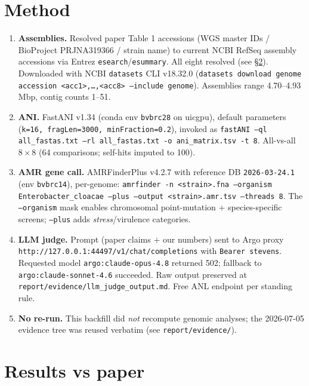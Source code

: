 \documentclass[11pt]{article}
\begin{document}
\section{Method}
\label{sec:method}
\begin{enumerate}[leftmargin=*]
\item \textbf{Assemblies.} Resolved paper Table 1 accessions (WGS master IDs / BioProject
      PRJNA319366 / strain name) to current NCBI RefSeq assembly accessions via Entrez
      \texttt{esearch}/\texttt{esummary}. All eight resolved (see \S\ref{sec:results}).
      Downloaded with NCBI \texttt{datasets} CLI v18.32.0
      (\texttt{datasets download genome accession <acc1>,\dots,<acc8> --include genome}).
      Assemblies range 4.70--4.93 Mbp, contig counts 1--51.
\item \textbf{ANI.} FastANI v1.34 (conda env \texttt{bvbrc28} on uicgpu), default parameters
      (\texttt{k=16, fragLen=3000, minFraction=0.2}), invoked as
      \texttt{fastANI --ql all\_fastas.txt --rl all\_fastas.txt -o ani\_matrix.tsv -t 8}.
      All-vs-all $8\times8$ (64 comparisons; self-hits imputed to 100).
\item \textbf{AMR gene call.} AMRFinderPlus v4.2.7 with reference DB \texttt{2026-03-24.1}
      (env \texttt{bvbrc14}), per-genome:
      \texttt{amrfinder -n <strain>.fna --organism Enterobacter\_cloacae --plus
      --output <strain>.amr.tsv --threads 8}. The \texttt{--organism} mask enables
      chromosomal point-mutation + species-specific screens; \texttt{--plus} adds
      \emph{stress}/virulence categories.
\item \textbf{LLM judge.} Prompt (paper claims $+$ our numbers) sent to Argo proxy
      \texttt{http://127.0.0.1:44497/v1/chat/completions} with \texttt{Bearer stevens}.
      Requested model \texttt{argo:claude-opus-4.8} returned 502; fallback to
      \texttt{argo:claude-sonnet-4.6} succeeded. Raw output preserved at
      \texttt{report/evidence/llm\_judge\_output.md}. Free ANL endpoint per standing rule.
\item \textbf{No re-run.} This backfill did \emph{not} recompute genomic analyses; the
      2026-07-05 evidence tree was reused verbatim (see \texttt{report/evidence/}).
\end{enumerate}

\section{Results vs paper}
\label{sec:results}
\end{document}
